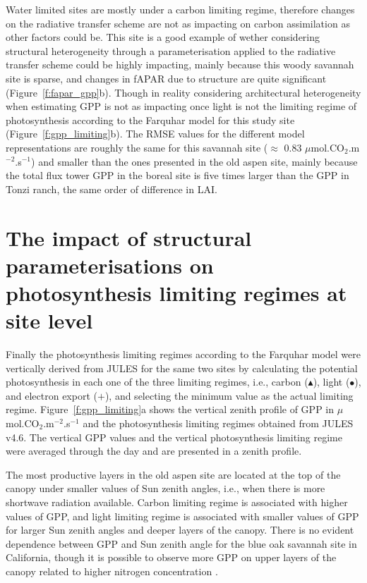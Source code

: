 \documentclass[a4paper,11pt]{report}
\begin{document}
Water limited sites are mostly under a carbon limiting regime, therefore changes on the radiative transfer scheme are not as impacting on carbon assimilation as other factors could be. This site is a good example of wether considering structural heterogeneity through a parameterisation applied to the radiative transfer scheme could be highly impacting, mainly because this woody savannah site is sparse, and changes in fAPAR due to structure are quite significant (Figure~\ref{f:fapar_gpp}b). Though in reality considering architectural heterogeneity when estimating GPP is not as impacting once light is not the limiting regime of photosynthesis according to the Farquhar model for this study site (Figure~\ref{f:gpp_limiting}b). The RMSE values for the different model representations are roughly the same for this savannah site ($\approx$ 0.83 $\mu$mol.CO$_2$.m$^{-2}$.s$^{-1}$) and smaller than the ones presented in the old aspen site, mainly because the total flux tower GPP in the boreal site is five times larger than the GPP in Tonzi ranch, the same order of difference in LAI.

\section{The impact of structural parameterisations on photosynthesis limiting regimes at site level}\label{section:limiting_evaluations}

Finally the photosynthesis limiting regimes according to the Farquhar model \citep{farquhar1980} were vertically derived from JULES for the same two sites by calculating the potential photosynthesis in each one of the three limiting regimes, i.e., carbon ($\blacktriangle$), light ($\bullet$), and electron export ($+$), and selecting the minimum value as the actual limiting regime. Figure~\ref{f:gpp_limiting}a shows the vertical zenith profile of GPP in $\mu$mol.CO$_2$.m$^{-2}$.s$^{-1}$ and the photosynthesis limiting regimes obtained from JULES v4.6. The vertical GPP values and the vertical photosynthesis limiting regime were averaged through the day and are presented in a zenith profile.

The most productive layers in the old aspen site are located at the top of the canopy under smaller values of Sun zenith angles, i.e., when there is more shortwave radiation available. Carbon limiting regime is associated with higher values of GPP, and light limiting regime is associated with smaller values of GPP for larger Sun zenith angles and deeper layers of the canopy. There is no evident dependence between GPP and Sun zenith angle for the blue oak savannah site in California, though it is possible to observe more GPP on upper layers of the canopy related to higher nitrogen concentration \citep{Mercado2007}.
\end{document}
